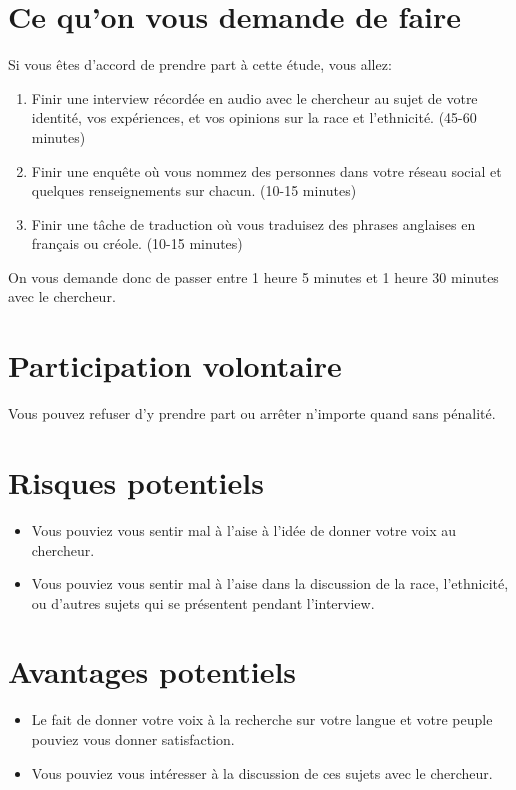 \documentclass{article}
\begin{document}
    \section{Ce qu'on vous demande de faire}
      Si vous êtes d'accord de prendre part à cette étude, vous allez:
      \begin{enumerate}
        \item Finir une interview récordée en audio avec le chercheur au sujet de votre identité, vos expériences, et vos opinions sur la race et l'ethnicité. (45-60 minutes)
        \item Finir une enquête où vous nommez des personnes dans votre réseau social et quelques renseignements sur chacun. (10-15 minutes)
        \item Finir une tâche de traduction où vous traduisez des phrases anglaises en français ou créole. (10-15 minutes)
      \end{enumerate}
      On vous demande donc de passer entre 1 heure 5 minutes et 1 heure 30 minutes avec le chercheur.

    \section{Participation volontaire}
      Vous pouvez refuser d'y prendre part ou arrêter n'importe quand sans pénalité.

    \section{Risques potentiels}
       \begin{itemize}
         \item Vous pouviez vous sentir mal à l'aise à l'idée de donner votre voix au chercheur.
         \item Vous pouviez vous sentir mal à l'aise dans la discussion de la race, l'ethnicité, ou d'autres sujets qui se présentent pendant l'interview.
       \end{itemize}

    \section{Avantages potentiels}
      \begin{itemize}
        \item Le fait de donner votre voix à la recherche sur votre langue et votre peuple pouviez vous donner satisfaction.
        \item Vous pouviez vous intéresser à la discussion de ces sujets avec le chercheur.
      \end{itemize}
\end{document}

